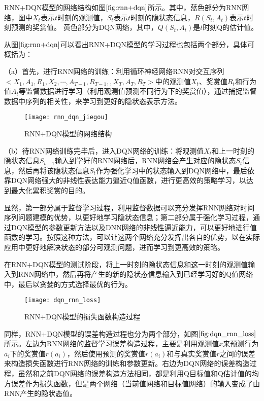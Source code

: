 RNN+DQN模型的网络结构如图$\ref{fig:rnn+dqn}$所示。其中，蓝色部分为RNN网络，图中$X_{t}$表示$t$时刻的观测值，$S_{t}$表示$t$时刻的隐状态信息，$R(S_{t}, A_{t})$表示$t$时刻预测的奖赏值。
黄色部分为DQN网络，其中，$Q(S_{t},A_{t})$是$t$时刻Q的估计值。


从图$\ref{fig:rnn+dqn}$可以看出RNN+DQN模型的学习过程也包括两个部分，具体可概括为：

（a）首先，进行RNN网络的训练：利用循环神经网络RNN对交互序列$<X_{1}, A_{1}, R_{1}, X_{2}, \cdots, A_{T-1}, R_{T-1}, ,X_{T}, A_{T}, R_{T}>$中的观测值$X_{t}$、奖赏值$R_{t}$和行为值$A_{t}$等监督数据进行学习（利用观测值预测不同行为下的奖赏值），通过捕捉监督数据中序列的相关性，来学习到更好的隐状态表示方法。

\begin{figure}[htbp]
\centering
\texttt{[image: rnn\_dqn\_jiegou]}
\caption{RNN+DQN模型的网络结构}
\label{fig:rnn+dqn}
\end{figure}

（b）待RNN网络训练完毕后，进入DQN网络的训练：将观测值$X_{t}$和上一时刻的隐状态信息$S_{t-1}$输入到学好的RNN网络后，RNN网络会产生对应的隐状态$S_{t}$信息，然后再将该隐状态信息$S_{t}$作为强化学习中的状态输入到DQN网络中，最后依靠DQN网络强大的非线性表达能力逼近Q值函数，进行更高效的策略学习，以达到最大化累积奖赏的目的。

显然，第一部分属于监督学习过程，利用监督数据可以充分发挥RNN网络对时间序列问题建模的优势，以更好地学习隐状态信息；第二部分属于强化学习过程，通过DQN模型的参数更新方法以及DNN网络的非线性逼近能力，可以更好地进行值函数的学习。按照这种方法，可以让这两个网络充分发挥出各自的优势，以在实际应用中更好地解决状态的部分可观测问题，进而学习到更高效的策略。

在RNN+DQN模型的测试阶段，将上一时刻的隐状态信息和这一时刻的观测值输入到RNN网络中，然后再将产生的新的隐状态信息输入到已经学习好的Q值网络中，最后以贪婪的方式选择最优的行为。

\begin{figure}[htbp]
\centering
\texttt{[image: dqn\_rnn\_loss]}
\caption{RNN+DQN模型的损失函数构造过程}
\label{fig:dqn_rnn_loss}
\end{figure}

同样，RNN+DQN模型的误差构造过程也分为两个部分，如图$\ref{fig:dqn_rnn_loss}$所示。左边为RNN网络的监督学习误差构造过程，主要是利用观测值$x$来预测行为$a_{i}$下的奖赏值$r(a_{i})$，然后使用预测的奖赏值$r(a_{i})$和与真实奖赏值$r$之间的误差来构造损失函数进行RNN网络的训练和参数更新。右边为DQN网络的误差构造过程，虽然和之前DQN网络的误差构造方法相同，都是利用Q目标值和Q估计值的均方误差作为损失函数，但是两个网络（当前值网络和目标值网络）的输入变成了由RNN产生的隐状态值。


